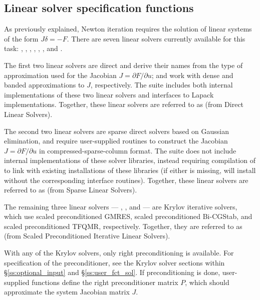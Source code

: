
\subsection{Linear solver specification functions}\label{sss:lin_solv_init}

As previously explained, Newton iteration requires the solution of
linear systems of the form $J\delta = -F$. There are seven {\kinsol} linear
solvers currently available for this task: {\kindense}, {\kinband},
{\kinklu}, {\kinsuperlumt}, {\kinspgmr}, {\kinspbcg}, and {\kinsptfqmr}.

The first two linear solvers are direct and derive their names from the
type of approximation used for the Jacobian $J = \partial{F}/\partial{u}$;
{\kindense} and {\kinband} work with dense and banded approximations
to $J$, respectively.  The {\sundials} suite includes both internal
implementations of these two linear solvers and interfaces to Lapack
implementations.  Together, these linear solvers are referred to as
{\kindls} (from Direct Linear Solvers).

The second two linear solvers are sparse direct solvers based on
Gaussian elimination, and require user-supplied routines to construct
the Jacobian $J = \partial{F}/\partial{u}$ in compressed-sparse-column
format. The {\sundials} suite does not include internal
implementations of these solver libraries, instead requiring
compilation of {\sundials} to link with existing installations of
these libraries (if either is missing, {\sundials} will install
without the corresponding interface routines).  Together, these linear
solvers are referred to as {\kinsls} (from Sparse Linear Solvers). 

The remaining three {\kinsol} linear solvers --- {\kinspgmr}, {\kinspbcg},
and {\kinsptfqmr} --- are Krylov iterative solvers, which use scaled
preconditioned GMRES, scaled preconditioned Bi-CGStab, and scaled
preconditioned TFQMR, respectively.  Together, they are referred to as
{\kinspils} (from Scaled Preconditioned Iterative Linear Solvers).

With any of the Krylov solvers, only right preconditioning is available.
For specification of the preconditioner, see the Krylov solver sections
within \S\ref{ss:optional_input} and \S\ref{ss:user_fct_sol}.
If preconditioning is done, user-supplied functions define the right
preconditioner matrix $P$, which should approximate the system
Jacobian matrix $J$.

